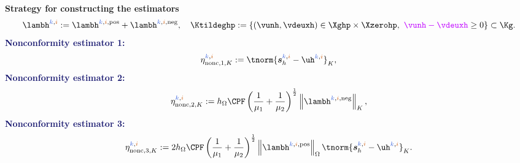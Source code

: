 \begin{frame}
\begin{overprint}
\vspace{0.2 cm}
\textcolor{cadmiumgreen}{\textbf{Strategy for constructing the estimators}}
\begin{equation*}
\lambh^{\kk,\ii} \egaldef \lambh^{\kk,\ii,\mathrm{pos}} + \lambh^{\kk,\ii,\mathrm{neg}}, \quad \Ktildeghp \egaldef \left\{(\vunh,\vdeuxh) \in \Xghp \times \Xzerohp, \ \textcolor{electricpurple}{\vunh-\vdeuxh} \geq 0  \right\} \subset \Kg.
\end{equation*}
\textcolor{midnightblue}{\textbf{Nonconformity estimator 1:}}
\begin{equation*}
\eta_{\mathrm{nonc},1,K}^{\kk,\ii}  \egaldef  \tnorm{{\bm s}_h^{\kk,\ii}-\uh^{\kk,\ii}}_K, 
\end{equation*}
\vspace{-0.1 cm}
\textcolor{midnightblue}{\textbf{Nonconformity estimator 2:}}
\begin{equation*}
\eta_{\mathrm{nonc},2,K}^{\kk,\ii} \egaldef h_{\Omega} \CPF \left(\frac{1}{\mu_1} +
\frac{1}{\mu_2} \right)^{\frac{1}{2}} \left\| \lambh^{\kk,\ii,\mathrm{neg}}\right\|_K, 
\end{equation*}
\vspace{-0.2 cm}
\textcolor{midnightblue}{\textbf{Nonconformity estimator 3:}}
\begin{equation*}
\eta_{\mathrm{nonc},3,K}^{\kk,\ii}  \egaldef 2 h_{\Omega} \CPF \left(\frac{1}{\mu_1} +
\frac{1}{\mu_2} \right)^{\frac{1}{2}} \left\|\lambh^{\kk,\ii,\mathrm{pos}}\right\|_{\Omega}
\tnorm{{\bm s}_{h}^{\kk,\ii}-\uh^{\kk,\ii}}_K.
\end{equation*}



\end{overprint}
\end{frame}
